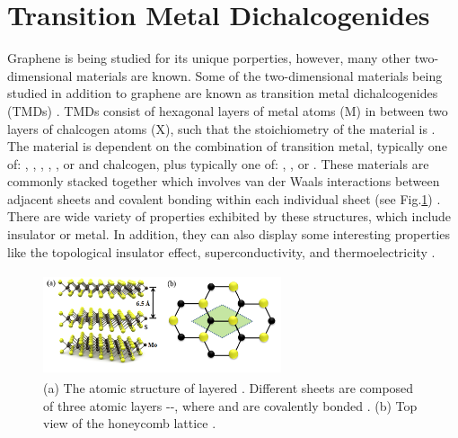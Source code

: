 \documentclass[%
 reprint,
 amsmath,amssymb,
 aps,
pra,
floatfix,
]{revtex4-1}
\begin{document}
\section{\label{sec:TMDs} Transition Metal Dichalcogenides}
Graphene is being studied for its unique porperties, however, many other two-dimensional materials are known. Some of the two-dimensional materials being studied in addition to graphene are known as transition metal dichalcogenides (TMDs) \cite{Mattheiss1973, Wilson1969}. TMDs consist of hexagonal layers of metal atoms (M) in between two layers of chalcogen atoms (X), such that the stoichiometry of the material is  \cite{grapheneLike2Dreview2013}. The material is dependent on the combination of transition metal, typically one of: , , , , , or  and chalcogen, plus typically one of: , , or  \cite{Wilson1969}. These materials are commonly stacked together which involves van der Waals interactions between adjacent sheets and covalent bonding within each individual sheet (see Fig.\ref{fig:mos2diagram}) \cite{grapheneLike2Dreview2013}. There are wide variety of properties exhibited by these structures, which include insulator or metal. In addition, they can also display some interesting properties like the topological insulator effect, superconductivity, and thermoelectricity \cite{Lang2012, Zhang2012, Gamble1975, Xie2009}. 
\begin{figure}
\includegraphics[height=3cm, width=7cm]{../figs/mos2diagram}
\caption{(a) The atomic structure of layered . Different sheets are composed of three atomic layers --, where  and  are covalently bonded \cite{Kis2011, grapheneLike2Dreview2013}. (b) Top view of the honeycomb lattice \cite{grapheneLike2Dreview2013}.}
\label{fig:mos2diagram}
\end{figure}
\end{document}
